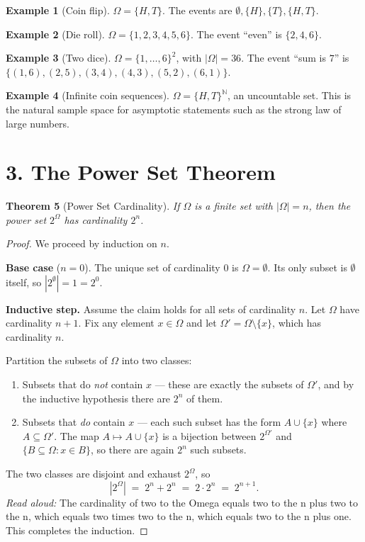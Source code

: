 \documentclass[11pt]{article}
\newtheorem{theorem}{Theorem}
\theoremstyle{definition}
\newtheorem{example}[theorem]{Example}
\begin{document}
\begin{example}[Coin flip]
$\Omega = \{H, T\}$. The events are $\emptyset, \{H\}, \{T\}, \{H, T\}$.
\end{example}

\begin{example}[Die roll]
$\Omega = \{1, 2, 3, 4, 5, 6\}$. The event ``even'' is $\{2, 4, 6\}$.
\end{example}

\begin{example}[Two dice]
$\Omega = \{1, \ldots, 6\}^2$, with $|\Omega| = 36$. The event ``sum is
$7$'' is $\{(1,6), (2,5), (3,4), (4,3), (5,2), (6,1)\}$.
\end{example}

\begin{example}[Infinite coin sequences]
$\Omega = \{H, T\}^{\mathbb{N}}$, an uncountable set. This is the natural
sample space for asymptotic statements such as the strong law of large
numbers.
\end{example}

\section*{3. The Power Set Theorem}

\begin{theorem}[Power Set Cardinality]
If $\Omega$ is a finite set with $|\Omega| = n$, then the power set
$2^{\Omega}$ has cardinality $2^n$.
\end{theorem}

\begin{proof}
We proceed by induction on $n$.

\medskip
\noindent\textbf{Base case} ($n = 0$). The unique set of cardinality $0$
is $\Omega = \emptyset$. Its only subset is $\emptyset$ itself, so
$|2^{\emptyset}| = 1 = 2^0$.

\medskip
\noindent\textbf{Inductive step.} Assume the claim holds for all sets of
cardinality $n$. Let $\Omega$ have cardinality $n + 1$. Fix any element
$x \in \Omega$ and let $\Omega' = \Omega \setminus \{x\}$, which has
cardinality $n$.

Partition the subsets of $\Omega$ into two classes:
\begin{enumerate}
\item Subsets that do \emph{not} contain $x$ --- these are exactly the
subsets of $\Omega'$, and by the inductive hypothesis there are $2^n$
of them.
\item Subsets that \emph{do} contain $x$ --- each such subset has the form
$A \cup \{x\}$ where $A \subseteq \Omega'$. The map $A \mapsto A \cup \{x\}$
is a bijection between $2^{\Omega'}$ and $\{B \subseteq \Omega : x \in B\}$,
so there are again $2^n$ such subsets.
\end{enumerate}
The two classes are disjoint and exhaust $2^{\Omega}$, so
\[
|2^{\Omega}| \;=\; 2^n + 2^n \;=\; 2 \cdot 2^n \;=\; 2^{n+1}.
\]
\emph{Read aloud:} The cardinality of two to the Omega equals two to the n plus two to the n, which equals two times two to the n, which equals two to the n plus one.
This completes the induction.
\end{proof}
\end{document}
